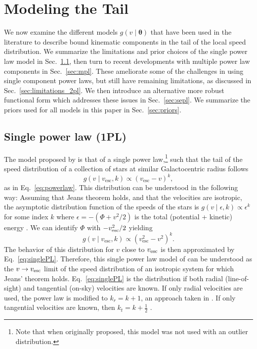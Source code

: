 \section{Modeling the Tail}\label{sec:modeling}

We now examine the different models $g(v \mid \mathbf{\theta})$ that have been used in the literature to describe bound kinematic components in the tail of the local speed distribution. We summarize the limitations and prior choices of the single power law model in Sec.~\ref{sec:1pl}, then turn to recent developments with multiple power law components in Sec.~\ref{sec:mpl}. These ameliorate some of the challenges in using single component power laws, but still have remaining limitations, as discussed in Sec.~\ref{sec:limitations_2pl}. We then introduce an alternative more robust functional form which addresses these issues in Sec.~\ref{sec:sepl}. We summarize the priors used for all models in this paper in Sec.~\ref{sec:priors}.


\subsection{Single power law (1PL)}
\label{sec:1pl}

The model proposed by \cite{Leonard1990} is that of a single power law,\footnote{Note that when originally proposed, this model was not used with an outlier distribution.} such that the tail of the speed distribution of a collection of stars at similar Galactocentric radius follows 
\begin{equation}\label{eq:singlePL}
    g(v \mid v_\mathrm{esc}, k) \propto (v_\mathrm{esc} - v)^{k},
\end{equation}
as in Eq.~\ref{eq:powerlaw}. This distribution can be understood in the following way: Assuming that Jeans theorem \citep{jeans:1915} holds, and that the velocities are isotropic, the asymptotic distribution function of the speeds of the stars is $g(v \mid \epsilon, k) \propto \epsilon^{k}$ for some index $k$ where $\epsilon = -(\Phi + v^2/2)$ is the total (potential + kinetic) energy \citep{kochanek:1996,smith:2007}. We can identify $\Phi$ with $-v_{\rm{esc}}^2/2$ yielding 
\begin{equation}\label{eq:singlePLsquare}
    g(v \mid v_\mathrm{esc}, k) \propto (v_\mathrm{esc}^2 - v^2)^{k}.
\end{equation}
The behavior of this distribution for $v$ close to $v_{\rm{esc}}$ is then approximated by Eq.~\ref{eq:singlePL}. Therefore, this single power law model of \cite{Leonard1990} can be understood as the $v\rightarrow v_{\rm{esc}}$ limit of the speed distribution of an isotropic system for which Jeans' theorem holds. 
Eq.~\ref{eq:singlePL} is the distribution if both radial (line-of-sight) and tangential (on-sky) velocities are known. If only radial velocities are used, the power law is modified to $k_r = k+1$, an approach taken in \cite{Piffl2014}. If only tangential velocities are known, then $k_t = k + \frac{1}{2}$ \citep{Monari2018,Koppelman2021}.

